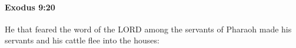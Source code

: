 
		\paragraph{Exodus 9:20} %
			\label{EXODUS-9-20}

			He that feared the word of the LORD among the servants of Pharaoh made his servants and his cattle flee into the houses:


